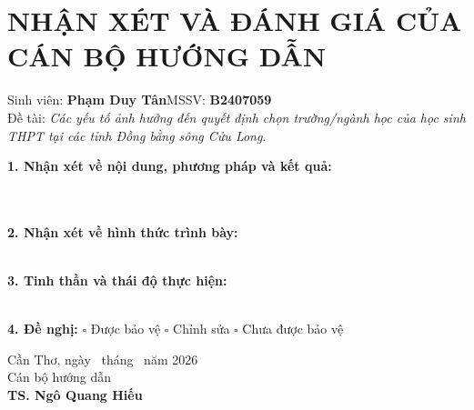 \chapter*{NHẬN XÉT VÀ ĐÁNH GIÁ CỦA CÁN BỘ HƯỚNG DẪN}\thispagestyle{empty}
\begingroup\small
\noindent Sinh viên: \textbf{Phạm Duy Tân}\hfill MSSV: \textbf{B2407059}\\
\noindent Đề tài: \textit{Các yếu tố ảnh hưởng đến quyết định chọn trường/ngành học của học sinh THPT tại các tỉnh Đồng bằng sông Cửu Long}.
\vspace{0.35cm}

\noindent\textbf{1. Nhận xét về nội dung, phương pháp và kết quả:}\\[0.15cm]
\dotfill\\[0.35cm]\dotfill\\[0.35cm]\dotfill

\noindent\textbf{2. Nhận xét về hình thức trình bày:}\\[0.15cm]
\dotfill\\[0.35cm]\dotfill

\noindent\textbf{3. Tinh thần và thái độ thực hiện:}\\[0.15cm]
\dotfill\\[0.35cm]\dotfill

\noindent\textbf{4. Đề nghị:} \quad $\square$ Được bảo vệ \qquad $\square$ Chỉnh sửa \qquad $\square$ Chưa được bảo vệ
\vfill
\begin{flushright}Cần Thơ, ngày \dotfill\ tháng \dotfill\ năm 2026\\Cán bộ hướng dẫn\\[1.4cm]\textbf{TS. Ngô Quang Hiếu}\end{flushright}
\endgroup
